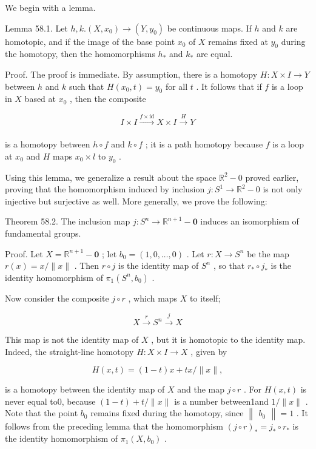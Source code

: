 \documentclass[10pt]{article}
\begin{document}
We begin with a lemma.

Lemma 58.1. Let \(h,k.\left( {X,{x}_{0}}\right)  \rightarrow  \left( {Y,{y}_{0}}\right)\) be continuous maps. If \(h\) and \(k\) are homotopic, and if the image of the base point \({x}_{0}\) of \(X\) remains fixed at \({y}_{0}\) during the homotopy, then the homomorphisms \({h}_{ * }\) and \({k}_{ * }\) are equal.

Proof. The proof is immediate. By assumption, there is a homotopy \(H : X \times  I \rightarrow  Y\) between \(h\) and \(k\) such that \(H\left( {{x}_{0},t}\right)  = {y}_{0}\) for all \(t\) . It follows that if \(f\) is a loop in \(X\) based at \({x}_{0}\) , then the composite

\[
I \times  I\xrightarrow[]{f \times  \mathrm{{id}}}X \times  I\xrightarrow[]{H}Y
\]

is a homotopy between \(h \circ  f\) and \(k \circ  f\) ; it is a path homotopy because \(f\) is a loop at \({x}_{0}\) and \(H\) maps \({x}_{0} \times  l\) to \({y}_{0}\) .

Using this lemma, we generalize a result about the space \({\mathbb{R}}^{2} - 0\) proved earlier, proving that the homomorphism induced by inclusion \(j : {S}^{1} \rightarrow  {\mathbb{R}}^{2} - 0\) is not only injective but surjective as well. More generally, we prove the following:

Theorem 58.2. The inclusion map \(j : {S}^{n} \rightarrow  {\mathbb{R}}^{n + 1} - \mathbf{0}\) induces an isomorphism of fundamental groups.

Proof. Let \(X = {\mathbb{R}}^{n + 1} - \mathbf{0}\) ; let \({b}_{0} = \left( {1,0,\ldots ,0}\right)\) . Let \(r : X \rightarrow  {S}^{n}\) be the map \(r\left( x\right)  = x/\parallel x\parallel\) . Then \(r \circ  j\) is the identity map of \({S}^{n}\) , so that \({r}_{ * } \circ  {j}_{ * }\) is the identity homomorphism of \({\pi }_{1}\left( {{S}^{n},{b}_{0}}\right)\) .

Now consider the composite \(j \circ  r\) , which maps \(X\) to itself;

\[
X\overset{r}{ \rightarrow  }{S}^{n}\overset{j}{ \rightarrow  }X
\]

This map is not the identity map of \(X\) , but it is homotopic to the identity map. Indeed, the straight-line homotopy \(H : X \times  I \rightarrow  X\) , given by

\[
H\left( {x,t}\right)  = \left( {1 - t}\right) x + {tx}/\parallel x\parallel ,
\]

is a homotopy between the identity map of \(X\) and the map \(j \circ  r\) . For \(H\left( {x,t}\right)\) is never equal to0, because \(\left( {1 - t}\right)  + t/\parallel x\parallel\) is a number between1and \(1/\parallel x\parallel\) . Note that the point \({b}_{0}\) remains fixed during the homotopy, since \(\begin{Vmatrix}{b}_{0}\end{Vmatrix} = 1\) . It follows from the preceding lemma that the homomorphism \({\left( j \circ  r\right) }_{ * } = {j}_{ * } \circ  {r}_{ * }\) is the identity homomorphism of \({\pi }_{1}\left( {X,{b}_{0}}\right)\) .
\end{document}

